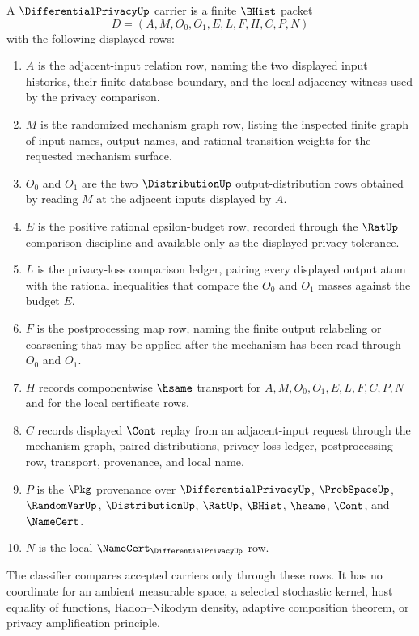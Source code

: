 \begin{definition}
\label{def:differential-privacy-carrier}
A $\DifferentialPrivacyUp$ carrier is a finite $\BHist$ packet
$$
D=(A,M,O_0,O_1,E,L,F,H,C,P,N)
$$
with the following displayed rows:
\begin{enumerate}
\item $A$ is the adjacent-input relation row, naming the two displayed input histories, their finite database boundary, and the local adjacency witness used by the privacy comparison.
\item $M$ is the randomized mechanism graph row, listing the inspected finite graph of input names, output names, and rational transition weights for the requested mechanism surface.
\item $O_0$ and $O_1$ are the two $\DistributionUp$ output-distribution rows obtained by reading $M$ at the adjacent inputs displayed by $A$.
\item $E$ is the positive rational epsilon-budget row, recorded through the $\RatUp$ comparison discipline and available only as the displayed privacy tolerance.
\item $L$ is the privacy-loss comparison ledger, pairing every displayed output atom with the rational inequalities that compare the $O_0$ and $O_1$ masses against the budget $E$.
\item $F$ is the postprocessing map row, naming the finite output relabeling or coarsening that may be applied after the mechanism has been read through $O_0$ and $O_1$.
\item $H$ records componentwise $\hsame$ transport for $A,M,O_0,O_1,E,L,F,C,P,N$ and for the local certificate rows.
\item $C$ records displayed $\Cont$ replay from an adjacent-input request through the mechanism graph, paired distributions, privacy-loss ledger, postprocessing row, transport, provenance, and local name.
\item $P$ is the $\Pkg$ provenance over $\DifferentialPrivacyUp$, $\ProbSpaceUp$, $\RandomVarUp$, $\DistributionUp$, $\RatUp$, $\BHist$, $\hsame$, $\Cont$, and $\NameCert$.
\item $N$ is the local $\NameCert_{\DifferentialPrivacyUp}$ row.
\end{enumerate}
The classifier compares accepted carriers only through these rows. It has no coordinate for an ambient measurable space, a selected stochastic kernel, host equality of functions, Radon--Nikodym density, adaptive composition theorem, or privacy amplification principle.
\end{definition}

